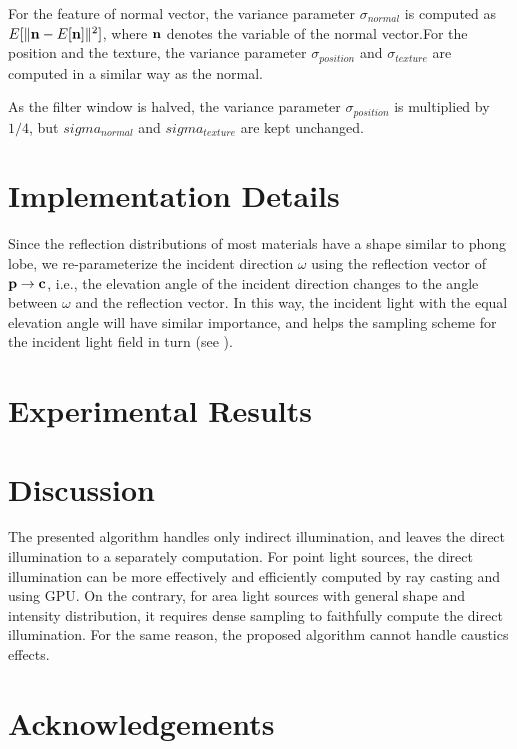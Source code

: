 \documentclass[review]{acmsiggraph}
\begin{document}
For the feature of normal vector, the variance parameter $\sigma_{normal}$ is computed as $E[\|{\bf n}-E[{\bf n}] \|^2]$, where $\bf n$ denotes the variable of the normal vector.For the position and the texture, the variance parameter $\sigma_{position}$ and $\sigma_{texture}$ are computed in a similar way as the normal. 

As the filter window is halved, the variance parameter $\sigma_{position}$ is multiplied by $1/4$, but $sigma_{normal}$ and $sigma_{texture}$ are kept unchanged.

\section{Implementation Details}

Since the reflection distributions of most materials have a shape similar to phong lobe, we re-parameterize the incident direction $\omega$ using the reflection vector of ${\bf p}\rightarrow{\bf c}$, i.e., the elevation angle of the incident direction changes to the angle between $\omega$ and the reflection vector. In this way, the incident light with the equal elevation angle will have similar importance, and helps the sampling scheme for the incident light field  in turn (see ).
\section{Experimental Results}

\section{Discussion}

The presented algorithm handles only indirect illumination, and leaves the direct illumination to a separately computation. For point light sources, the direct illumination can be more effectively and efficiently computed by ray casting and using GPU. On the contrary, for area light sources with general shape and intensity distribution, it requires dense sampling to faithfully compute the direct illumination. For the same reason, the proposed algorithm cannot handle caustics effects.

\section*{Acknowledgements}


\nocite{*}

\end{document}

